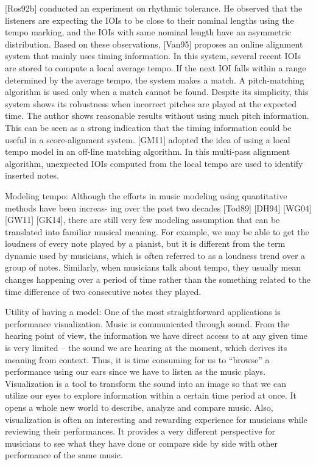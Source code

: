 \documentclass[12pt]{article}
\begin{document}
[Ros92b] conducted an experiment on rhythmic tolerance. He observed
that the listeners are expecting the IOIs to be close to their nominal
lengths using the tempo marking, and the IOIs with same nominal length
have an asymmetric distribution. Based on these observations, [Van95]
proposes an online alignment system that mainly uses timing
information. In this system, several recent IOIs are stored to compute
a local average tempo. If the next IOI falls within a range determined
by the average tempo, the system makes a match. A pitch-matching
algorithm is used only when a match cannot be found. Despite its
simplicity, this system shows its robustness when incorrect pitches
are played at the expected time. The author shows reasonable results
without using much pitch information. This can be seen as a strong
indication that the timing information could be useful in a
score-alignment system. [GM11] adopted the idea of using a local tempo
model in an off-line matching algorithm. In this multi-pass alignment
algorithm, unexpected IOIs computed from the local tempo are used to
identify inserted notes. 


Modeling tempo:
Although the efforts in music modeling using quantitative methods have
been increas- ing over the past two decades [Tod89] [DH94] [WG04]
[GW11] [GK14], there are still very few modeling assumption that can
be translated into familiar musical meaning. For example, we may be
able to get the loudness of every note played by a pianist, but it is
different from the term dynamic used by musicians, which is often
referred to as a loudness trend over a group of notes. Similarly, when
musicians talk about tempo, they usually mean changes happening over a
period of time rather than the something related to the time
difference of two consecutive notes they played. 

Utility of having a model:
One of the most straightforward applications is performance
visualization. Music is communicated through sound. From the hearing
point of view, the information we have direct access to at any given
time is very limited – the sound we are hearing at the moment, which
derives its meaning from context. Thus, it is time consuming for us to
“browse” a performance using our ears since we have to listen as the
music plays. Visualization is a tool to transform the sound into an
image so that we can utilize our eyes to explore information within a
certain time period at once. It opens a whole new world to describe,
analyze and compare music. Also, visualization is often an interesting
and rewarding experience for musicians while reviewing their
performances. It provides a very different perspective for musicians
to see what they have done or compare side by side with other
performance of the same music.
\end{document}
